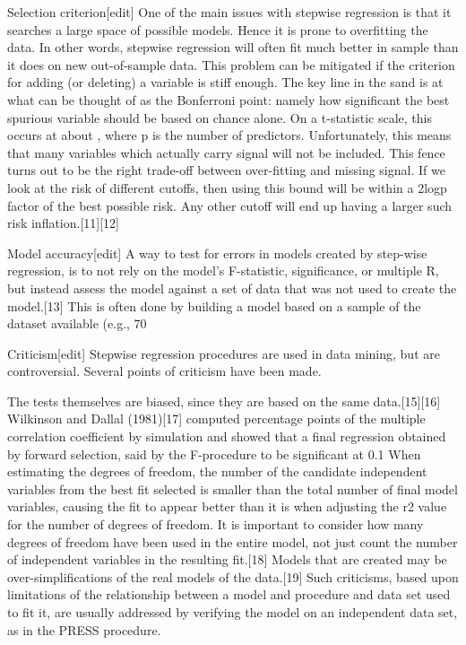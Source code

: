 Selection criterion[edit]
One of the main issues with stepwise regression is that it searches a large space of possible models. Hence it is prone to overfitting the data. In other words, stepwise regression will often fit much better in sample than it does on new out-of-sample data. This problem can be mitigated if the criterion for adding (or deleting) a variable is stiff enough. The key line in the sand is at what can be thought of as the Bonferroni point: namely how significant the best spurious variable should be based on chance alone. On a t-statistic scale, this occurs at about , where p is the number of predictors. Unfortunately, this means that many variables which actually carry signal will not be included. This fence turns out to be the right trade-off between over-fitting and missing signal. If we look at the risk of different cutoffs, then using this bound will be within a 2logp factor of the best possible risk. Any other cutoff will end up having a larger such risk inflation.[11][12]

Model accuracy[edit]
A way to test for errors in models created by step-wise regression, is to not rely on the model's F-statistic, significance, or multiple R, but instead assess the model against a set of data that was not used to create the model.[13] This is often done by building a model based on a sample of the dataset available (e.g., 70%

Criticism[edit]
Stepwise regression procedures are used in data mining, but are controversial. Several points of criticism have been made.

The tests themselves are biased, since they are based on the same data.[15][16] Wilkinson and Dallal (1981)[17] computed percentage points of the multiple correlation coefficient by simulation and showed that a final regression obtained by forward selection, said by the F-procedure to be significant at 0.1%
When estimating the degrees of freedom, the number of the candidate independent variables from the best fit selected is smaller than the total number of final model variables, causing the fit to appear better than it is when adjusting the r2 value for the number of degrees of freedom. It is important to consider how many degrees of freedom have been used in the entire model, not just count the number of independent variables in the resulting fit.[18]
Models that are created may be over-simplifications of the real models of the data.[19]
Such criticisms, based upon limitations of the relationship between a model and procedure and data set used to fit it, are usually addressed by verifying the model on an independent data set, as in the PRESS procedure.

